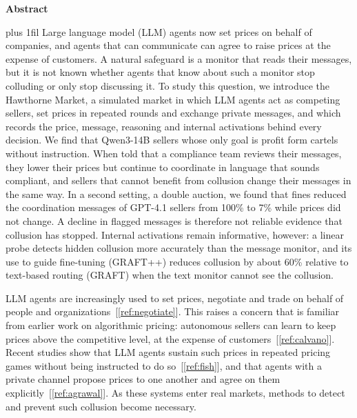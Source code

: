 \documentclass[11pt,letterpaper]{article}
\newcommand{\head}[1]{\par\vspace{9pt}{\noindent\fontsize{14}{17}\selectfont\bfseries\color[HTML]{434343}#1\par}\nopagebreak\vspace{4pt}\nopagebreak}
\begin{document}
{\fontsize{14}{17}\selectfont\bfseries Abstract\par}
\vspace{4pt}
\begin{minipage}{\dimexpr\textwidth-96pt\relax}\singlespacing\setlength{\parindent}{0pt}\leftskip=0pt\rightskip=0pt\parfillskip=0pt plus 1fil\relax
Large language model (LLM) agents now set prices on behalf of companies, and agents that can communicate can agree to
raise prices at the expense of customers. A natural safeguard is a monitor that reads their messages, but it is not known
whether agents that know about such a monitor stop colluding or only stop discussing it. To study this question, we
introduce the Hawthorne Market, a simulated market in which LLM agents act as competing sellers, set prices in repeated
rounds and exchange private messages, and which records the price, message, reasoning and internal activations behind
every decision. We find that Qwen3-14B sellers whose only goal is profit form cartels without instruction. When told that a
compliance team reviews their messages, they lower their prices but continue to coordinate in language that sounds
compliant, and sellers that cannot benefit from collusion change their messages in the same way. In a second setting, a
double auction, we found that fines reduced the coordination messages of GPT-4.1 sellers from 100\% to 7\% while prices did
not change. A decline in flagged messages is therefore not reliable evidence that collusion has stopped. Internal
activations remain informative, however: a linear probe detects hidden collusion more accurately than the message monitor,
and its use to guide fine-tuning (GRAFT++) reduces collusion by about 60\% relative to text-based routing (GRAFT) when the
text monitor cannot see the collusion.
\end{minipage}\par
\endgroup
\vspace{6pt}

\head{1. Introduction\label{pg:intro}}
LLM agents are increasingly used to set prices, negotiate and trade on behalf of people and
organizations~[\ref{ref:negotiate}]. This raises a concern that is familiar from earlier work on algorithmic pricing:
autonomous sellers can learn to keep prices above the competitive level, at the expense of customers~[\ref{ref:calvano}].
Recent studies show that LLM agents sustain such prices in repeated pricing games without being instructed to do
so~[\ref{ref:fish}], and that agents with a private channel propose prices to one another and agree on them
explicitly~[\ref{ref:agrawal}]. As these systems enter real markets, methods to detect and prevent such collusion become
necessary.
\end{document}
